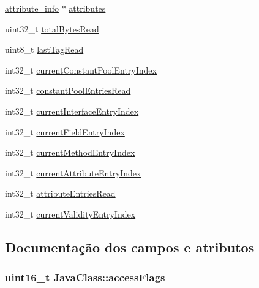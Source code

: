 \begin{DoxyCompactItemize}
\item 
\hyperlink{structattribute__info}{attribute\+\_\+info} $\ast$ \hyperlink{structJavaClass_ae90496c9f9b340ef216b24359cb2ff63}{attributes}
\item 
uint32\+\_\+t \hyperlink{structJavaClass_a58b471dbb758d2a3c1bbd6e0e90fb6e2}{total\+Bytes\+Read}
\item 
uint8\+\_\+t \hyperlink{structJavaClass_a57b0443668351c7380e3d8cdb3e97d7d}{last\+Tag\+Read}
\item 
int32\+\_\+t \hyperlink{structJavaClass_adedfcc5044efcb1c0798a87d52d30360}{current\+Constant\+Pool\+Entry\+Index}
\item 
int32\+\_\+t \hyperlink{structJavaClass_a7e50281e01408da883645af7d983570c}{constant\+Pool\+Entries\+Read}
\item 
int32\+\_\+t \hyperlink{structJavaClass_a45a51f67c49e0c528c212a65051bc349}{current\+Interface\+Entry\+Index}
\item 
int32\+\_\+t \hyperlink{structJavaClass_ad62c5545a3b4151e71bdc7b742606c55}{current\+Field\+Entry\+Index}
\item 
int32\+\_\+t \hyperlink{structJavaClass_a2a78abe9f88e0538b2912e6c72c22426}{current\+Method\+Entry\+Index}
\item 
int32\+\_\+t \hyperlink{structJavaClass_a26d4612d384289588b48be393c9705ac}{current\+Attribute\+Entry\+Index}
\item 
int32\+\_\+t \hyperlink{structJavaClass_aefcb0a0fbf6d98692680922792d74401}{attribute\+Entries\+Read}
\item 
int32\+\_\+t \hyperlink{structJavaClass_a785953f9978e474e59dada8ed5b17b25}{current\+Validity\+Entry\+Index}
\end{DoxyCompactItemize}


\subsection{Documentação dos campos e atributos}
\subsubsection[{\texorpdfstring{access\+Flags}{accessFlags}}]{\setlength{\rightskip}{0pt plus 5cm}uint16\+\_\+t Java\+Class\+::access\+Flags}\hypertarget{structJavaClass_a305af686b39aafe8248cb4b5af0f5ad4}{}\label{structJavaClass_a305af686b39aafe8248cb4b5af0f5ad4}
